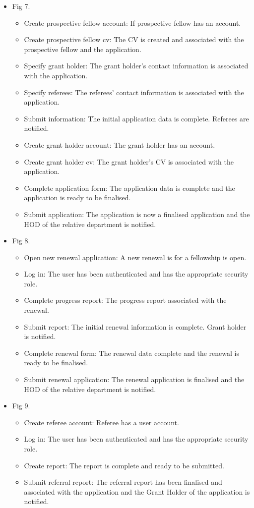 \documentclass[12pt]{article}
\begin{document}
\begin{itemize}
	\item Fig 7.
		\begin{itemize}
			\item Create prospective fellow account: If prospective fellow has an account.
			\item Create prospective fellow cv: The CV is created and associated with the prospective fellow and the application.
			\item Specify grant holder: The grant holder's contact information is associated with the application.
			\item Specify referees: The referees' contact information is associated with the application.
			\item Submit information: The initial application data is complete. Referees are notified.				
			\item Create grant holder account: The grant holder has an account.
			\item Create grant holder cv: The grant holder's CV is associated with the application.
			\item Complete application form: The application data is complete and the application is ready to be finalised.
			\item Submit application: The application is now a finalised application and the HOD of the relative department is notified. 									
		\end{itemize}
	
	\item Fig 8.
		\begin{itemize}
			\item Open new renewal application: A new renewal is for a fellowship is open.
			\item Log in: The user has been authenticated and has the appropriate security role.
			\item Complete progress report: The progress report associated with	the renewal.		
			\item Submit report: The initial renewal information is complete. Grant holder is notified.
			\item Complete renewal form: The renewal data complete and the renewal is ready to be finalised.			
			\item Submit renewal application: The renewal application is finalised and the HOD of the relative department is notified.									
		\end{itemize}
	
	\item Fig 9.
		\begin{itemize}
			\item Create referee account: Referee has a user account.
			\item Log in: The user has been authenticated and has the appropriate security role.
			\item Create report: The report is complete and ready to be submitted.				
			\item Submit referral report: The referral report has been finalised and associated with the application and the Grant Holder of the application is notified.									
		\end{itemize}
		

\end{itemize}
\end{document}
